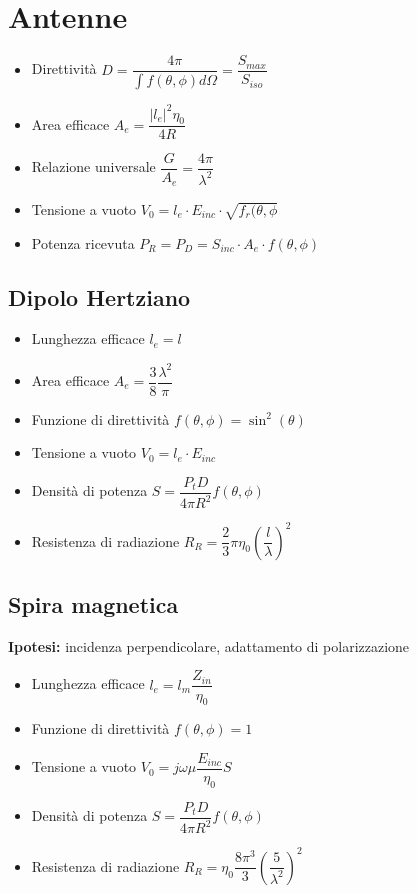 \documentclass{article}
\begin{document}
\section{Antenne}
\begin{itemize}
	\item Direttività \( \displaystyle D = \dfrac{4 \pi}{\int{f(\theta, \phi) d \Omega}} = \dfrac{S_{max}}{S_{iso}} \)	
	\item Area efficace \( \displaystyle A_e = \dfrac{|l_e| ^ 2 \eta_0}{4 R} \)
	\item Relazione universale \( \dfrac{G}{A_e} = \dfrac{4 \pi}{\lambda^2} \)
	\item Tensione a vuoto \( V_0 = l_e \cdot E_{inc} \cdot \sqrt{f_r(\theta, \phi} \)
	\item Potenza ricevuta \(P_R = P_D = S_{inc} \cdot A_e \cdot  f(\theta, \phi) \)
\end{itemize}

\subsection{Dipolo Hertziano}
\begin{itemize}
	\item Lunghezza efficace \(l_e = l\)
	\item Area efficace \(A_e = \dfrac{3}{8} \dfrac{\lambda^2}{\pi} \)
	\item Funzione di direttività \(f(\theta, \phi) = \sin^2(\theta) \)
	\item Tensione a vuoto \( V_0 = l_e \cdot E_{inc} \) 
	\item Densità di potenza \( S = \dfrac{P_t D}{4 \pi R^2} f(\theta, \phi) \)
	\item Resistenza di radiazione \( R_R = \dfrac{2}{3} \pi \eta_0 \left( \dfrac{l}{\lambda} \right) ^ 2 \)
\end{itemize}

\subsection{Spira magnetica}
\textbf{Ipotesi:} incidenza perpendicolare, adattamento di polarizzazione
\begin{itemize}
	\item Lunghezza efficace \(l_e = l_m \dfrac{Z_{in}}{\eta_0}\)
	\item Funzione di direttività \(f(\theta, \phi) = 1 \)
	\item Tensione a vuoto \( V_0 = j \omega \mu \dfrac{E_{inc}}{\eta_0} S \) 
	\item Densità di potenza \( S = \dfrac{P_t D}{4 \pi R^2} f(\theta, \phi) \)
	\item Resistenza di radiazione \( R_R = \eta_0 \dfrac{8 \pi^3}{3}\left( \dfrac{5}{\lambda^2} \right) ^ 2 \)
	
\end{itemize}
\end{document}
